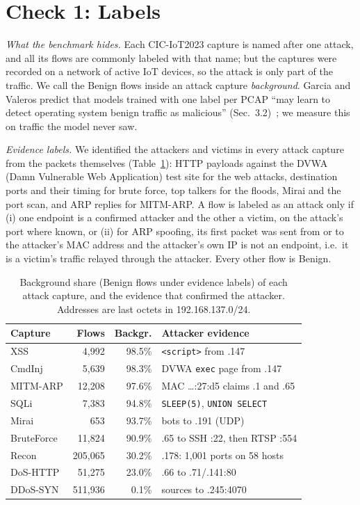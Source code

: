 \section{Check 1: Labels}\label{sec:labels}

\emph{What the benchmark hides.} Each CIC-IoT2023 capture is named after one attack, and all its flows are commonly labeled with that name; but the captures were recorded on a network of active IoT devices, so the attack is only part of the traffic. We call the Benign flows inside an attack capture \emph{background}. Garcia and Valeros predict that models trained with one label per PCAP ``may learn to detect operating system benign traffic as malicious'' (Sec.~3.2)~\cite{garcia2023labeling}; we measure this on traffic the model never saw.

\emph{Evidence labels.} We identified the attackers and victims in every attack capture from the packets themselves (Table~\ref{tab:background}): HTTP payloads against the DVWA (Damn Vulnerable Web Application) test site for the web attacks, destination ports and their timing for brute force, top talkers for the floods, Mirai and the port scan, and ARP replies for MITM-ARP. A flow is labeled as an attack only if (i) one endpoint is a confirmed attacker and the other a victim, on the attack's port where known, or (ii) for ARP spoofing, its first packet was sent from or to the attacker's MAC address and the attacker's own IP is not an endpoint, i.e.\ it is a victim's traffic relayed through the attacker. Every other flow is Benign.

\begin{table}[t]
\centering
\caption{Background share (Benign flows under evidence labels) of each attack capture, and the evidence that confirmed the attacker. Addresses are last octets in 192.168.137.0/24.}
\label{tab:background}
\footnotesize
\setlength{\tabcolsep}{3pt}
\begin{tabular}{lrr>{\raggedright\arraybackslash}p{3.85cm}}
\hline
Capture & Flows & Backgr. & Attacker evidence \\
\hline
XSS          &   4,992 & 98.5\% & \texttt{<script>} from .147 \\
CmdInj       &   5,639 & 98.3\% & DVWA \texttt{exec} page from .147 \\
MITM-ARP     &  12,208 & 97.6\% & MAC \ldots:27:d5 claims .1 and .65 \\
SQLi         &   7,383 & 94.8\% & \texttt{SLEEP(5)}, \texttt{UNION SELECT} \\
Mirai        &     653 & 93.7\% & 7 bots to .191 (UDP) \\
BruteForce   &  11,824 & 90.9\% & .65 to SSH :22, then RTSP :554 \\
Recon        & 205,065 & 30.2\% & .178: 1,001 ports on 58 hosts \\
DoS-HTTP     &  51,275 & 23.0\% & .66 to .71/.141:80 \\
DDoS-SYN     & 511,936 &  0.1\% & 6 sources to .245:4070 \\
\hline
\end{tabular}
\end{table}


